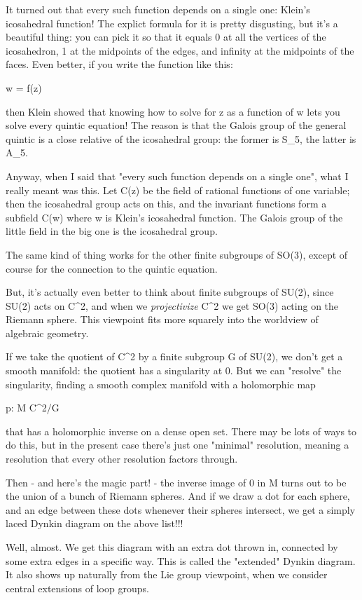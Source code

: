 It turned out that every such function depends on a single one: 
Klein's icosahedral function!  The explict formula for it is pretty
disgusting, but it's a beautiful thing: you can pick it so that it 
equals 0 at all the vertices of the icosahedron, 1 at the midpoints
of the edges, and infinity at the midpoints of the faces.  Even
better, if you write the function like this:

w = f(z)

then Klein showed that knowing how to solve for z as a function of w 
lets you solve every quintic equation!  The reason is that the Galois
group of the general quintic is a close relative of the icosahedral
group: the former is S_{5}, the latter is A_{5}.

Anyway, when I said that "every such function depends 
on a single one",
what I really meant was this.  Let C(z) be the field of rational functions
of one variable; then the icosahedral group acts on this,
and the invariant functions form a subfield C(w) where w is Klein's
icosahedral function.  The Galois group of the little field in the big
one is the icosahedral group.

The same kind of thing works for the other finite subgroups of SO(3),
except of course for the connection to the quintic equation.

But, it's actually even better to think about finite subgroups of 
SU(2), since SU(2) acts on C^{2}, and when we \emph{projectivize} C^{2} we
get SO(3) acting on the Riemann sphere.  This viewpoint fits more 
squarely into the worldview of algebraic geometry.

If we take the quotient of C^{2} by a finite subgroup G of SU(2), we 
don't get a smooth manifold: the quotient has a singularity at 0.
But we can "resolve" the singularity, finding a smooth complex manifold
with a holomorphic map

p: M \to  C^{2}/G

that has a holomorphic inverse on a dense open set.  There may be 
lots of ways to do this, but in the present case there's just one 
"minimal" resolution, meaning a resolution that every other resolution
factors through.

Then - and here's the magic part! - the inverse image of 0 in M 
turns out to be the union of a bunch of Riemann spheres.  And
if we draw a dot for each sphere, and an edge between these dots 
whenever their spheres intersect, we get a simply laced Dynkin 
diagram on the above list!!!

Well, almost.  We get this diagram with an extra dot thrown in,
connected by some extra edges in a specific way.  This is called 
the "extended" Dynkin diagram.  It also shows up naturally from 
the Lie group viewpoint, when we consider central extensions of 
loop groups.  

